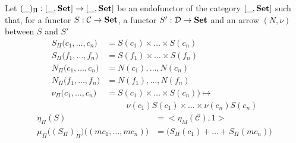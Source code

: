 \documentclass{report}
\newcommand{\prodmon}{\Pi}
\begin{document}
\begin{defn}[The monad $(\_)_\prodmon$]
    Let $(\_)_\prodmon : [\_, \bf Set] \rightarrow [\_,\bf Set]$ be an endofunctor of the category $ [\_, \bf Set] $ such that, for a functor $S : \mathcal{C} \rightarrow \bf Set$, a functor $S' : \mathcal{D} \rightarrow \bf Set$ and an arrow $(N,\nu)$ between $S$ and $S'$
    \begin{align*}
        S_\prodmon\big(c_1,\dots,c_n\big)
         & = S(c_1)\times\dots\times S(c_n)           \\
        S_\prodmon\big(f_1,\dots,f_n\big)
         & = S(f_1)\times\dots\times S(f_n)           \\
        N_\prodmon\big(c_1,\dots,c_n\big)
         & = N(c_1),\dots, N(c_n)                     \\
        N_\prodmon\big(f_1,\dots,f_n\big)
         & = N(f_1),\dots, N(f_n)                     \\
        \nu_\prodmon\big(c_1,\dots,c_n\big)
         & = S(c_1)\times\dots\times S(c_n))  \mapsto \\
         & \hspace{1cm}
        \nu(c_1) S(c_1)\times\dots\times \nu(c_n) S(c_n)
    \end{align*}
    \begin{align*}
        \eta_\prodmon(S)                                                       & = \big<\eta_M(\mathcal{C}),\mathrm{1}\big>             \\
        \mu_\prodmon\big((S_\prodmon)_\prodmon\big)\big((mc_1,\dots,mc_n)\big) & =  \big(S_\prodmon(c_1)+ \dots + S_\prodmon(mc_n)\big) \\
    \end{align*}
\end{defn}
\end{document}
